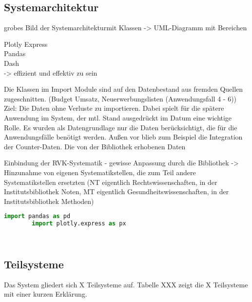     \subsection{Systemarchitektur}
    
    grobes Bild der Systemarchitekturmit Klassen -> UML-Diagramm mit Bereichen
    
    
    Plotly Express\\
    Pandas\\
    Dash\\
    -> effizient und effektiv zu sein


Die Klassen im Import Module sind auf den Datenbestand aus fremden Quellen zugeschnitten.
(Budget Umsatz, Neuerwerbungslisten (Anwendungsfall 4 - 6))
Ziel: Die Daten ohne Verluste zu importieren. Dabei spielt für die spätere Anwendung im System, der mtl. Stand
ausgedrückt im Datum eine wichtige Rolle.
Es wurden als Datengrundlage nur die Daten berücksichtigt, die für die Anwendungsfälle benötigt werden.
Außen vor blieb zum Beispiel die Integration der Counter-Daten.
Die von der Bibliothek erhobenen Daten

Einbindung der RVK-Systematik - gewisse Anpassung durch die Bibliothek -> Hinzunahme von eigenen Systematikstellen,
die zum Teil andere Systematikstellen ersetzten (NT eigentlich Rechtswissenschaften, in der Institutsbibliothek Noten, MT eigentlich
Gesundheitswissenschaften, in der Institutsbibliothek Methoden)

    \begin{lstlisting}[language=Python, caption=Python example]
        import pandas as pd
        import plotly.express as px

        
    \end{lstlisting}

    \subsection{Teilsysteme}
    Das System gliedert sich X Teilsysteme auf. Tabelle XXX zeigt die X Teilsysteme mit einer kurzen Erklärung.
    
